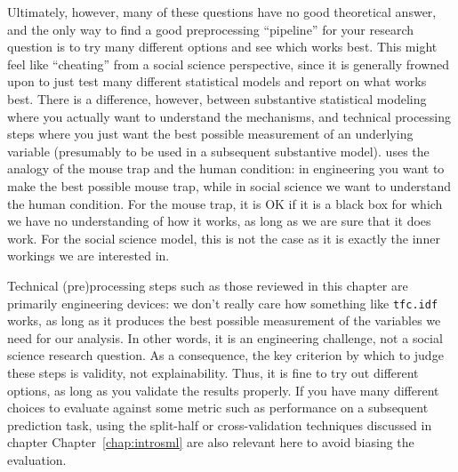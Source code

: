 Ultimately, however, many of these questions have no good theoretical answer, and the only way to find a good preprocessing ``pipeline'' for your research question is to try many different
options and see which works best.
This might feel like ``cheating'' from a social science perspective, since it is generally frowned upon to just test many different statistical models and report on what works best.
There is a difference, however, between substantive statistical modeling where you actually want to understand the mechanisms,
and technical processing steps where you just want the best possible measurement of an underlying variable (presumably to be used in a subsequent substantive model).
\citet{mousetrap} uses the analogy of the mouse trap and the human condition: in engineering you want to make the best possible mouse trap,
while in social science we want to understand the human condition.
For the mouse trap, it is OK if it is a black box for which we have no understanding of how it works, as long as we are sure that it does work.
For the social science model, this is not the case as it is exactly the inner workings we are interested in.

Technical (pre)processing steps such as those reviewed in this chapter are primarily engineering devices:
we don't really care how something like \verb|tfc.idf| works, as long as it produces the best possible measurement of the variables we need for our analysis.
In other words, it is an engineering challenge, not a social science research question.
As a consequence, the key criterion by which to judge these steps is validity, not explainability.
Thus, it is fine to try out different options, as long as you validate the results properly.
If you have many different choices to evaluate against some metric such as performance on a subsequent prediction task,
using the split-half or cross-validation techniques discussed in chapter Chapter~\ref{chap:introsml} are also relevant here to avoid biasing the evaluation.

